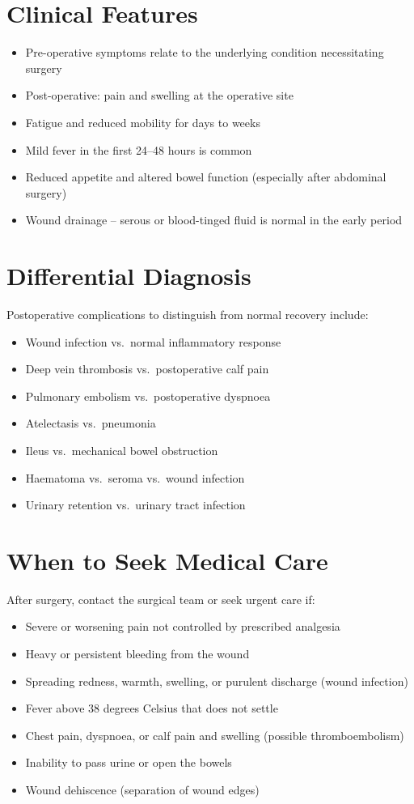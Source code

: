 \section*{Clinical Features}
\begin{itemize}
    \item Pre-operative symptoms relate to the underlying condition necessitating surgery
    \item Post-operative: pain and swelling at the operative site
    \item Fatigue and reduced mobility for days to weeks
    \item Mild fever in the first 24--48 hours is common
    \item Reduced appetite and altered bowel function (especially after abdominal surgery)
    \item Wound drainage -- serous or blood-tinged fluid is normal in the early period
\end{itemize}

\section*{Differential Diagnosis}
Postoperative complications to distinguish from normal recovery include:

\begin{itemize}
    \item Wound infection vs.\ normal inflammatory response
    \item Deep vein thrombosis vs.\ postoperative calf pain
    \item Pulmonary embolism vs.\ postoperative dyspnoea
    \item Atelectasis vs.\ pneumonia
    \item Ileus vs.\ mechanical bowel obstruction
    \item Haematoma vs.\ seroma vs.\ wound infection
    \item Urinary retention vs.\ urinary tract infection
\end{itemize}

\section*{When to Seek Medical Care}
After surgery, contact the surgical team or seek urgent care if:
\begin{itemize}
    \item Severe or worsening pain not controlled by prescribed analgesia
    \item Heavy or persistent bleeding from the wound
    \item Spreading redness, warmth, swelling, or purulent discharge (wound infection)
    \item Fever above 38 degrees Celsius that does not settle
    \item Chest pain, dyspnoea, or calf pain and swelling (possible thromboembolism)
    \item Inability to pass urine or open the bowels
    \item Wound dehiscence (separation of wound edges)
\end{itemize}

